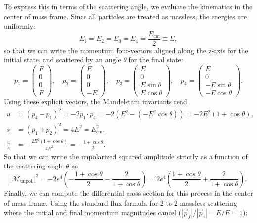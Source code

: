 To express this in terms of the scattering angle, we evaluate the kinematics in the center of mass frame. Since all particles are treated as massless, the energies are uniformly:
\[
    E_1 = E_2 = E_3 = E_4 = \frac{E_{\text{cm}}}{2} \equiv E,
\]
so that we can write the momentum four-vectors aligned along the z-axis for the initial state, and scattered by an angle $\theta$ for the final state:
\[
    p_1 = \begin{pmatrix} E \\ 0 \\ 0 \\ E \end{pmatrix}, \quad p_2 = \begin{pmatrix} E \\ 0 \\ 0 \\ -E \end{pmatrix}, \quad p_3 = \begin{pmatrix} E \\ 0 \\ E \sin \theta \\ E \cos \theta \end{pmatrix}, \quad p_4 = \begin{pmatrix} E \\ 0 \\ -E \sin \theta \\ -E \cos \theta \end{pmatrix}.
\]
Using these explicit vectors, the Mandelstam invariants read
\[
    \begin{aligned}
        u           & = (p_4 - p_1)^2 = - 2 p_1 \cdot p_4 = -2 (E^2 - (-E^2 \cos \theta)) = -2 E^2 (1 + \cos \theta), \\
        s           & = (p_1 + p_2)^2 = 4 E^2 = E_{\text{cm}}^2,                                                      \\
        \frac{u}{s} & = - \frac{2E^2(1 + \cos \theta)}{4E^2} = - \frac{1 + \cos \theta}{2}.
    \end{aligned}
\]
So that we can write the unpolarized squared amplitude strictly as a function of the scattering angle \(\theta\) as
\[
    \vert \mathcal{M}_{\text{unpol.}} \vert^2 = -2 e^4 \left( - \frac{1 + \cos \theta}{2} - \frac{2}{1 + \cos \theta} \right) = 2 e^4 \left( \frac{1 + \cos \theta}{2} + \frac{2}{1 + \cos \theta} \right).
\]
Finally, we can compute the differential cross section for this process in the center of mass frame. Using the standard flux formula for 2-to-2 massless scattering where the initial and final momentum magnitudes cancel ($|\vec{p}_f| / |\vec{p}_i| = E/E = 1$):
